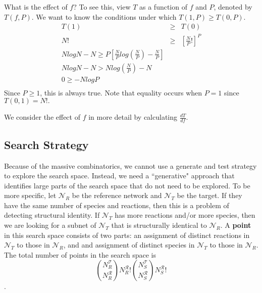 \documentclass{article}
\newcommand{\net}[1]{$\mathcal{N}_#1$} %
\begin{document}
What is the effect of $f$? To see this, view $T$ as a function of $f$ and $P$, denoted by $T(f, P)$. We want to know the conditions under which $T(1, P) \geq T(0, P)$.
\begin{eqnarray}
T(1) & \geq & T(0) \\
N! & \geq & \left[ \frac{N}{P}! \right]^P \\
N log N - N \geq P \left[ \frac{N}{P} log \left( \frac{N}{P} \right) - \frac{N}{P} \right] \\ 
N log N - N >  N log \left( \frac{N}{P} \right) - N  \\
0 \geq  - N log P  \\
\end{eqnarray}
Since $P \geq 1$, this is always true. Note that equality occurs when $P=1$ since $T(0, 1) = N!.$

We consider the effect of $f$ in more detail by calculating $\frac{d T}{df}$.

\subsection{Search Strategy}
Because of the massive combinatorics, we cannot use a generate and test strategy to explore the search space. Instead, we need a ``generative" approach that identifies large parts of the search space that do not need to be explored. To be more specific, let \net{R} be the reference network and \net{T} be the target. If they have the same number of species and reactions, then this is a problem of detecting structural identity. If \net{T} has more reactions and/or more species, then we are looking for a subnet of \net{T} that is structurally identical to \net{R}. A {\bf point} in this search space consists of two parts: an assignment of distinct reactions in \net{T} to those in \net{R}, and and assignment of distinct species in \net{T} to those in \net{R}. The total number of points in the search space is
$$ {{N^{\mathcal{T}}_R} \choose {N^{\mathcal{R}}_R}} {N^{\mathcal{R}}_R}!
 {{N^{\mathcal{T}}_S} \choose {N^{\mathcal{R}}_S}} {N^{\mathcal{R}}_S}!
$$.
\end{document}
